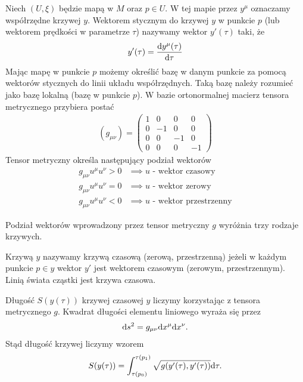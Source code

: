 \begin{definition}
Niech $(U,\xi)$ będzie mapą w $M$ oraz $p\in U$. W tej mapie 
przez $y^\mu$ oznaczamy współrzędne krzywej $y$.
Wektorem stycznym do krzywej $y$ w punkcie $p$  
(lub wektorem prędkości w 
parametrze $\tau$) nazywamy wektor $y'(\tau)$ taki, że
\begin{align*}
y' (\tau )= \frac{\text{d} y^\mu (\tau) }{\text{d} \tau}
\end{align*}
Mając mapę w punkcie $p$ możemy określić bazę w danym punkcie
za pomocą wektorów stycznych do linii układu współrzędnych.
Taką bazę należy rozumieć jako bazę lokalną (bazę w punkcie $p$).
W bazie ortonormalnej macierz tensora metrycznego
przybiera postać 
\begin{align*}
( g_{\mu\nu} ) = \left(
\begin{array}{cccc}
1 & 0 & 0 & 0\\
0 & -1 & 0 & 0 \\
0 & 0 & -1 & 0 \\
0 & 0 & 0 & -1 
\end{array}
\right)
\end{align*}
Tensor metryczny określa następujący podział wektorów
\begin{align*}
g_{\mu\nu}u^\mu u^\nu > 0& \implies u \text{ - wektor czasowy}\\
g_{\mu\nu}u^\mu u^\nu = 0& \implies u \text{ - wektor zerowy}\\
g_{\mu\nu}u^\mu u^\nu < 0& \implies u \text{ - wektor przestrzenny}
\end{align*}
\end{definition}
Podział wektorów wprowadzony przez tensor metryczny $g$ 
wyróżnia trzy rodzaje krzywych. 
\begin{definition}
Krzywą $y$ nazywamy krzywą czasową (zerową, przestrzenną)
jeżeli w każdym punkcie $p \in y$ wektor $y'$ jest 
wektorem czasowym
(zerowym, przestrzennym). Linią świata cząstki
jest krzywa czasowa. 
\end{definition}
Długość $S(y(\tau))$ krzywej czasowej $y$ liczymy 
korzystając z tensora metrycznego $g$. 
Kwadrat długości elementu liniowego wyraża się przez
\begin{align*}
\text{d} s^2 = g_{\mu\nu} \text{d} x^\mu \text{d} x^\nu.
\end{align*}
Stąd długość krzywej liczymy wzorem
\begin{align}\label{dlugosc_krzywej}
S( y(\tau) ) = \int_{\tau(p_0)}^{\tau(p_1)} \sqrt{g (
y' (\tau), y' (\tau) )} \text{d} \tau.
\end{align}
